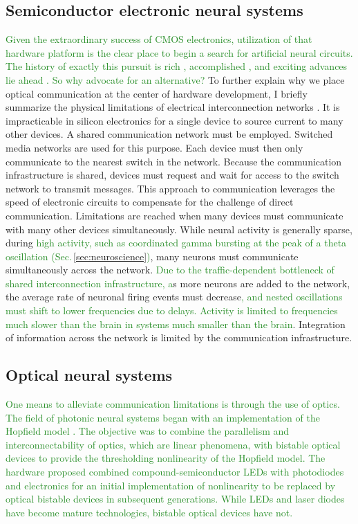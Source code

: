 \documentclass[twocolumn]{article}
\begin{document}
\subsection{Semiconductor electronic neural systems}
\textcolor{ForestGreen}{Given the extraordinary success of CMOS electronics, utilization of that hardware platform is the clear place to begin a search for artificial neural circuits. The history of exactly this pursuit is rich \cite{me1989,me1990,lide2015}, accomplished \cite{voma2007,inli2011,chst2014,aast2018,boro2018}, and exciting advances lie ahead \cite{stin2019}. So why advocate for an alternative?} To further explain why we place optical communication at the center of hardware development, I briefly summarize the physical limitations of electrical interconnection networks \cite{hepa2012}. It is impracticable in silicon electronics for a single device to source current to many other devices. A shared communication network must be employed. Switched media networks are used for this purpose. Each device must then only communicate to the nearest switch in the network. Because the communication infrastructure is shared, devices must request and wait for access to the switch network to transmit messages. This approach to communication leverages the speed of electronic circuits to compensate for the challenge of direct communication. Limitations are reached when many devices must communicate with many other devices simultaneously. While neural activity is generally sparse, during \textcolor{ForestGreen}{high activity, such as coordinated gamma bursting at the peak of a theta oscillation (Sec.\,\ref{sec:neuroscience})}, many neurons must communicate simultaneously across the network. \textcolor{ForestGreen}{Due to the traffic-dependent bottleneck of shared interconnection infrastructure, a}s more neurons are added to the network, the average rate of neuronal firing events must decrease\textcolor{ForestGreen}{, and nested oscillations must shift to lower frequencies due to delays. Activity is limited to frequencies much slower than the brain in systems much smaller than the brain}. Integration of information across the network is limited by the communication infrastructure.

\subsection{Optical neural systems}
\textcolor{ForestGreen}{One means to alleviate communication limitations is through the use of optics. The field of photonic neural systems began \cite{psfa1985,faps1985} with an implementation of the Hopfield model \cite{ho1982}. The objective was to combine the parallelism and interconnectability of optics, which are linear phenomena, with bistable optical devices to provide the thresholding nonlinearity of the Hopfield model. The hardware proposed combined compound-semiconductor LEDs with photodiodes and electronics for an initial implementation of nonlinearity to be replaced by optical bistable devices in subsequent generations. While LEDs and laser diodes have become mature technologies, bistable optical devices have not.}
\end{document}
